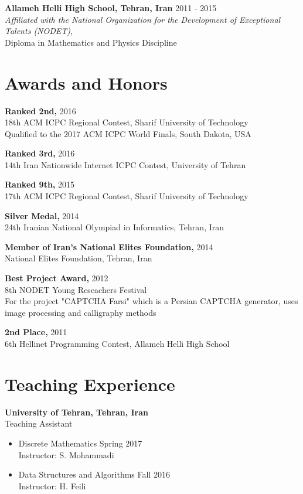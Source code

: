 \documentclass[margin]{res}
\begin{document}
\begin{resume}
    {\bf Allameh Helli High School, Tehran, Iran} \hfill 2011 - 2015
    \\\textit{\scriptsize Affiliated with the National Organization for the Development of Exceptional Talents (NODET),}
    \\Diploma in Mathematics and Physics Discipline

\vspace{5mm}


\section{Awards and Honors}
	{\bf Ranked 2nd,} \hfill 2016
	\\18th ACM ICPC Regional Contest, Sharif University of Technology
	\\Qualified to the 2017 ACM ICPC World Finals, South Dakota, USA
	
	{\bf Ranked 3rd,} \hfill 2016
	\\14th Iran Nationwide Internet ICPC Contest, University of Tehran

    {\bf Ranked 9th,} \hfill 2015
    \\17th ACM ICPC Regional Contest, Sharif University of Technology

    {\bf Silver Medal,} \hfill 2014
    \\24th Iranian National Olympiad in Informatics, Tehran, Iran
    
    {\bf Member of Iran's National Elites Foundation,} \hfill 2014
    \\National Elites Foundation, Tehran, Iran
    
    {\bf Best Project Award,} \hfill 2012
    \\8th NODET Young Reseachers Festival
    \\For the project "CAPTCHA Farsi" which is a Persian CAPTCHA generator, uses image processing and calligraphy methods
     
    {\bf 2nd Place,} \hfill 2011
    \\6th Hellinet Programming Contest, Allameh Helli High School

\vspace{5mm}


\section{Teaching Experience}
	{\bf University of Tehran, Tehran, Iran}
	\\Teaching Assistant
	\begin{itemize}
		\item Discrete Mathematics \hfill Spring 2017
	    \\ Instructor: S. Mohammadi
	    \item Data Structures and Algorithms \hfill Fall 2016
	    \\ Instructor: H. Feili
	\end{itemize}


\end{resume}
\end{document}
